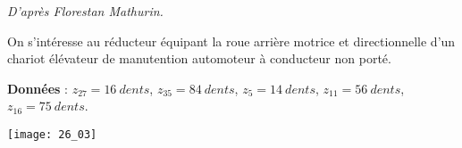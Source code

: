 \normaltrue \difficilefalse \tdifficilefalse
\correctiontrue



\textit{D'après Florestan Mathurin.}

\setcounter{question}{0}%
\ifcorrection
\else
{}
\fi

\ifprof
\else
On s’intéresse au réducteur équipant la roue arrière motrice et directionnelle d’un chariot élévateur de manutention automoteur à conducteur non porté. 


\textbf{Données }: $z_{27} = \SI{16}{dents}$, $z_{35} = \SI{84}{dents}$, $z_{5} = \SI{14}{dents}$, $z_{11} = \SI{56}{dents}$, $z_{16} = \SI{75}{dents}$. 

\fi


\ifprof
\else
\begin{marginfigure}
\texttt{[image: 26\_03]}
\end{marginfigure}
\fi
%

